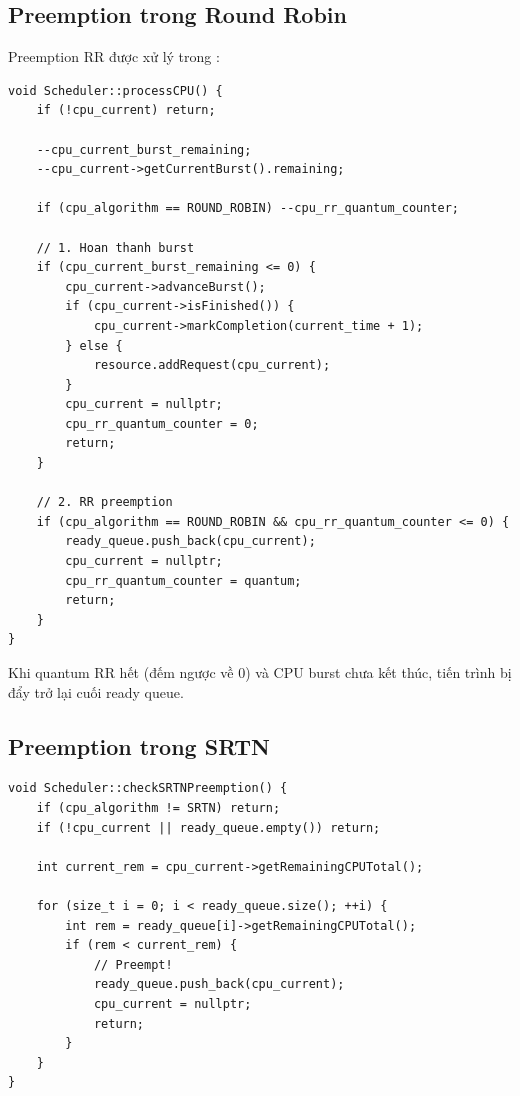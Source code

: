 \subsection{Preemption trong Round Robin}

Preemption RR được xử lý trong :

\begin{lstlisting}
void Scheduler::processCPU() {
    if (!cpu_current) return;
    
    --cpu_current_burst_remaining;
    --cpu_current->getCurrentBurst().remaining;
    
    if (cpu_algorithm == ROUND_ROBIN) --cpu_rr_quantum_counter;
    
    // 1. Hoan thanh burst
    if (cpu_current_burst_remaining <= 0) {
        cpu_current->advanceBurst();
        if (cpu_current->isFinished()) {
            cpu_current->markCompletion(current_time + 1);
        } else {
            resource.addRequest(cpu_current);
        }
        cpu_current = nullptr;
        cpu_rr_quantum_counter = 0;
        return;
    }
    
    // 2. RR preemption
    if (cpu_algorithm == ROUND_ROBIN && cpu_rr_quantum_counter <= 0) {
        ready_queue.push_back(cpu_current);
        cpu_current = nullptr;
        cpu_rr_quantum_counter = quantum;
        return;
    }
}
\end{lstlisting}

Khi quantum RR hết (đếm ngược về 0) và CPU burst chưa kết thúc, tiến trình bị đẩy trở lại cuối ready queue.

\subsection{Preemption trong SRTN}

\begin{lstlisting}
void Scheduler::checkSRTNPreemption() {
    if (cpu_algorithm != SRTN) return;
    if (!cpu_current || ready_queue.empty()) return;
    
    int current_rem = cpu_current->getRemainingCPUTotal();
    
    for (size_t i = 0; i < ready_queue.size(); ++i) {
        int rem = ready_queue[i]->getRemainingCPUTotal();
        if (rem < current_rem) {
            // Preempt!
            ready_queue.push_back(cpu_current);
            cpu_current = nullptr;
            return;
        }
    }
}
\end{lstlisting}

